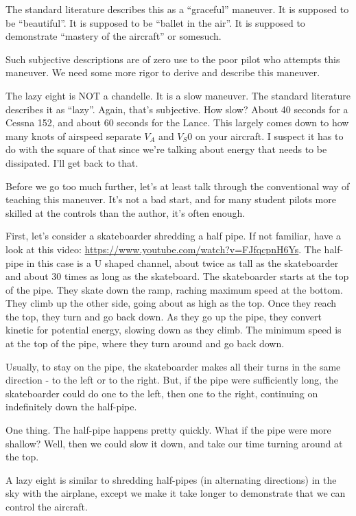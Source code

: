 The standard literature describes this as a ``graceful'' maneuver. It is supposed to be ``beautiful''. It is supposed to be ``ballet in the air''. It is supposed to demonstrate ``mastery of the aircraft'' or somesuch.

Such subjective descriptions are of zero use to the poor pilot who attempts this maneuver. We need some more rigor to derive and describe this maneuver.

The lazy eight is NOT a chandelle. It is a slow maneuver. The standard literature describes it as ``lazy''. Again, that's subjective. How slow? About 40 seconds for a Cessna 152, and about 60 seconds for the Lance. This largely comes down to how many knots of airspeed separate $V_A$ and $V_S0$ on your aircraft. I suspect it has to do with the square of that since we're talking about energy that needs to be dissipated. I'll get back to that.

Before we go too much further, let's at least talk through the conventional way of teaching this maneuver. It's not a bad start, and for many student pilots more skilled at the controls than the author, it's often enough.

First, let's consider a skateboarder shredding a half pipe. If not familiar, have a look at this video: \url{https://www.youtube.com/watch?v=FJfqcpnH6Ys}. The half-pipe in this case is a U shaped channel, about twice as tall as the skateboarder and about 30 times as long as the skateboard. The skateboarder starts at the top of the pipe. They skate down the ramp, raching maximum speed at the bottom. They climb up the other side, going about as high as the top. Once they reach the top, they turn and go back down. As they go up the pipe, they convert kinetic for potential energy, slowing down as they climb. The minimum speed is at the top of the pipe, where they turn around and go back down.

Usually, to stay on the pipe, the skateboarder makes all their turns in the same direction - to the left or to the right. But, if the pipe were sufficiently long, the skateboarder could do one to the left, then one to the right, continuing on indefinitely down the half-pipe.

One thing. The half-pipe happens pretty quickly. What if the pipe were more shallow? Well, then we could slow it down, and take our time turning around at the top.

A lazy eight is similar to shredding half-pipes (in alternating directions) in the sky with the airplane, except we make it take longer to demonstrate that we can control the aircraft.

